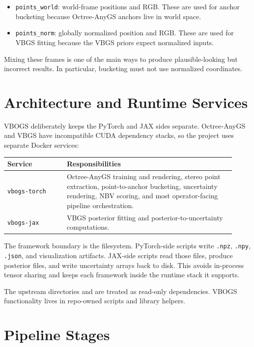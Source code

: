 \documentclass[11pt]{article}
\begin{document}
\begin{itemize}
  \item \texttt{points\_world}: world-frame positions and RGB. These are used
        for anchor bucketing because Octree-AnyGS anchors live in world space.
  \item \texttt{points\_norm}: globally normalized position and RGB. These are
        used for VBGS fitting because the VBGS priors expect normalized inputs.
\end{itemize}

Mixing these frames is one of the main ways to produce plausible-looking but
incorrect results. In particular, bucketing must not use normalized
coordinates.

\section{Architecture and Runtime Services}

VBOGS deliberately keeps the PyTorch and JAX sides separate. Octree-AnyGS and
VBGS have incompatible CUDA dependency stacks, so the project uses separate
Docker services:

\begin{longtable}{@{}p{0.24\linewidth}p{0.68\linewidth}@{}}
\toprule
\textbf{Service} & \textbf{Responsibilities} \\
\midrule
\endhead
\texttt{vbogs-torch} &
Octree-AnyGS training and rendering, stereo point extraction, point-to-anchor
bucketing, uncertainty rendering, NBV scoring, and most operator-facing
pipeline orchestration. \\
\texttt{vbogs-jax} &
VBGS posterior fitting and posterior-to-uncertainty computations. \\
\bottomrule
\end{longtable}

The framework boundary is the filesystem. PyTorch-side scripts write
\texttt{.npz}, \texttt{.npy}, \texttt{.json}, and visualization artifacts. JAX-side
scripts read those files, produce posterior files, and write uncertainty
arrays back to disk. This avoids in-process tensor sharing and keeps each
framework inside the runtime stack it supports.

The upstream directories  and  are treated as
read-only dependencies. VBOGS functionality lives in repo-owned scripts and
library helpers.

\section{Pipeline Stages}
\end{document}
